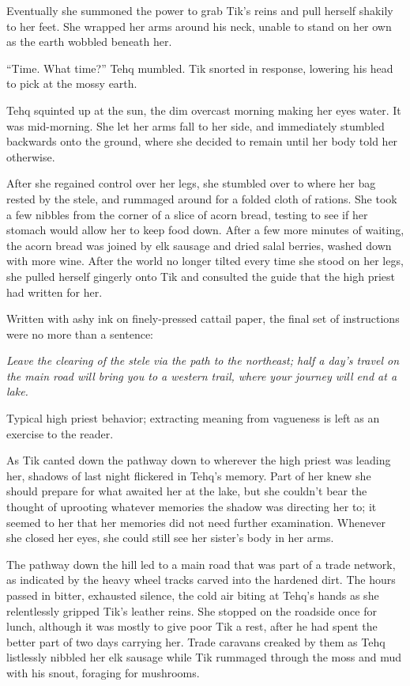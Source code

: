 Eventually she summoned the power to grab Tik's reins and pull herself shakily to her feet. She wrapped her arms around his neck, unable to stand on her own as the earth wobbled beneath her.

``Time. What time?'' Tehq mumbled. Tik snorted in response, lowering his head to pick at the mossy earth.

Tehq squinted up at the sun, the dim overcast morning making her eyes water. It was mid-morning. She let her arms fall to her side, and immediately stumbled backwards onto the ground, where she decided to remain until her body told her otherwise.

After she regained control over her legs, she stumbled over to where her bag rested by the stele, and rummaged around for a folded cloth of rations. She took a few nibbles from the corner of a slice of acorn bread, testing to see if her stomach would allow her to keep food down. After a few more minutes of waiting, the acorn bread was joined by elk sausage and dried salal berries, washed down with more wine. After the world no longer tilted every time she stood on her legs, she pulled herself gingerly onto Tik and consulted the guide that the high priest had written for her.

Written with ashy ink on finely-pressed cattail paper, the final set of instructions were no more than a sentence:

\emph{Leave the clearing of the stele via the path to the northeast; half a day's travel on the main road will bring you to a western trail, where your journey will end at a lake.}

Typical high priest behavior; extracting meaning from vagueness is left as an exercise to the reader.

As Tik canted down the pathway down to wherever the high priest was leading her, shadows of last night flickered in Tehq's memory. Part of her knew she should prepare for what awaited her at the lake, but she couldn't bear the thought of uprooting whatever memories the shadow was directing her to; it seemed to her that her memories did not need further examination. Whenever she closed her eyes, she could still see her sister's body in her arms.

The pathway down the hill led to a main road that was part of a trade network, as indicated by the heavy wheel tracks carved into the hardened dirt. The hours passed in bitter, exhausted silence, the cold air biting at Tehq's hands as she relentlessly gripped Tik's leather reins. She stopped on the roadside once for lunch, although it was mostly to give poor Tik a rest, after he had spent the better part of two days carrying her. Trade caravans creaked by them as Tehq listlessly nibbled her elk sausage while Tik rummaged through the moss and mud with his snout, foraging for mushrooms.

